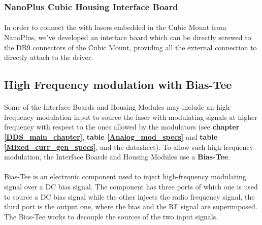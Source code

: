 
\subsubsection{NanoPlus Cubic Housing Interface Board} 
\paragraph{} In order to connect the \QubeModel  with lasers embedded in the Cubic Mount from NanoPlus, we've developed an interface board which can be directly screwed to the DB9 connectors of the Cubic Mount, providing all the external connection to directly attach to the \QubeModel  driver.





\subsection{High Frequency modulation with Bias-Tee}
\paragraph{} Some of the Interface Boards and Housing Modules may include an high-frequency modulation input to source the laser with modulating signals at higher frequency with respect to the ones allowed by the \QubeModel  modulators (see \textbf{chapter \ref{DDS_main_chapter}}, \textbf{table \ref{Analog_mod_specs}} and \textbf{table \ref{Mixed_curr_gen_specs}}, and the \QubeModel  datasheet).
\newline To allow such high-frequency modulation, the Interface Boards and Housing Modules use a \textbf{Bias-Tee}.

\paragraph{}Bias-Tee is an electronic component used to inject high-frequency modulating signal over a DC bias signal. The component has three ports of which one is used to source a DC bias signal while the other injects the radio frequency signal, the third port is the output one, where the bias and the RF signal are superimposed. The Bias-Tee works to decouple the sources of the two input signals.

